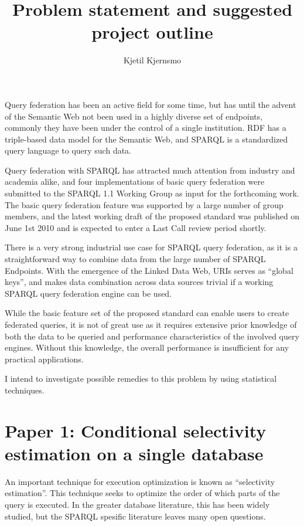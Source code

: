 \documentclass[a4paper,english,10pt]{article}
\title{Problem statement and suggested project outline}
\author{Kjetil Kjernsmo}
\begin{document}
\maketitle


Query federation has been an active field for some time, but has until
the advent of the Semantic Web not been used in a highly diverse set
of endpoints, commonly they have been under the control of a single
institution. RDF has a triple-based data model for the Semantic Web,
and SPARQL is a standardized query language to query such data.

Query federation with SPARQL has attracted much attention
from industry and academia alike, and four implementations of basic
query federation were submitted to the SPARQL 1.1 Working Group as
input for the forthcoming work. The basic query federation feature was
supported by a large number of group members, and the latest working
draft of the proposed standard was published on June 1st 2010 and is
expected to enter a Last Call review period shortly.

There is a very strong industrial use case for SPARQL query
federation, as it is a straightforward way to combine data from the
large number of SPARQL Endpoints. With the emergence of the Linked
Data Web, URIs serves as ``global keys'', and makes data combination
across data sources trivial if a working SPARQL query federation
engine can be used.

While the basic feature set of the proposed standard can enable users
to create federated queries, it is not of great use as it requires
extensive prior knowledge of both the data to be queried and
performance characteristics of the involved query engines. Without
this knowledge, the overall performance is insufficient for any
practical applications.

I intend to investigate possible remedies to this problem by using
statistical techniques. 

\section*{Paper 1: Conditional selectivity estimation on a single database}


An important technique for execution optimization is known as
``selectivity estimation''. This technique seeks to optimize the order
of which parts of the query is executed. In the greater database
literature, this has been widely studied, but the SPARQL spesific
literature leaves many open questions.
\end{document}
